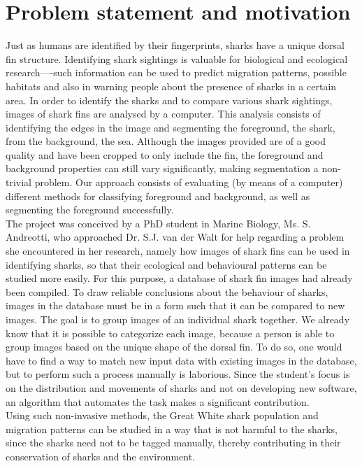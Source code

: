 \documentclass[a4paper,10pt]{article}
\begin{document}
\newpage
\tableofcontents

\newpage
\section{Problem statement and motivation}
Just as humans are identified by their fingerprints, sharks have a unique
dorsal fin structure.  Identifying shark sightings is
valuable for biological and ecological research----such information can be used to predict migration
patterns, possible habitats and also in warning people about the
  presence of sharks in a certain area.  In order to identify the sharks and to compare various shark sightings,
images of
shark fins are analysed by a computer. 
This analysis consists of identifying the edges in the image and segmenting the
foreground, the shark, from the background, the sea.
Although the images provided are of a good quality and have been cropped
to only include the fin, the
foreground and background properties can still vary significantly, making
segmentation a
non-trivial problem. Our approach consists of
evaluating (by means of a computer) different methods for classifying foreground
and background, as well as segmenting the foreground successfully.  \\

The project was conceived by a PhD
student in Marine Biology, Ms. S. Andreotti, who approached Dr. S.J. van der Walt for
help regarding a problem she encountered in her research, namely
how images of shark fins  can be used in identifying sharks, so that their
ecological and behavioural patterns can be studied more easily.
For this purpose, a database of shark fin images had already been compiled.
To
draw reliable conclusions about the behaviour of sharks, images in the
database must be in a form such that it can be compared to new images.
The goal is to group images of an individual shark together.  We
already know that it is possible to categorize each image, because a
  person is able to group images based on the unique shape of the
dorsal fin.  To do so, one would have to find a way to match new
input data with existing images in the database, but to perform such a
  process manually is laborious. 
Since the student's 
focus is on the distribution and movements of sharks and not on developing new
software, an algorithm that automates the task makes a significant contribution. \\

Using such non-invasive methods, the Great White shark population and migration
patterns can be studied in a way that is not harmful to
the sharks, since the sharks need not to be tagged manually, thereby
contributing in their conservation of sharks and the environment.  
\end{document}
